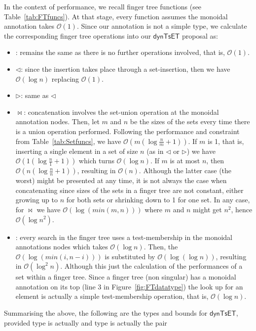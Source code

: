 \documentclass{elsarticle}
\newcommand{\code}[1]{\haskell{#1}}
\newcommand{\MATHSF}[1]{\ensuremath{\mathsf{#1}}\xspace}
\newcommand{\dyntset}{\MATHSF{dynTsET}}
\renewcommand{\O}{\ensuremath{\mathcal{O}}}
\begin{document}
In the context of performance, we recall finger tree functions (see Table~\ref{tab:FTfuncs}). At that stage, every function assumes the monoidal annotation takes $\O(1)$. Since our annotation is not a simple type, we calculate the corresponding finger tree operations into our \dyntset proposal as:
\begin{itemize}
\item \code{viewl}: remains the same as there is no further operations involved, that is, $\O(1)$.
\item $\lhd$: since the insertion takes place through a set-insertion, then we have $\O(\log n)$ replacing $\O(1)$.
\item $\rhd$: same as $\lhd$
\item $\bowtie$: concatenation involves the set-union operation at the monoidal annotation nodes. Then, let $m$ and $n$ be the sizes of the sets every time there is a union operation performed. Following the performance and constraint from Table~\ref{tab:Setfuncs}, we have $\O(m(\log\frac{n}{m} +1))$. If $m$ is 1, that is, inserting a single element in a set of size $n$ (as in $\lhd$ or $\rhd$) we have $\O(1(\log\frac{n}{1} +1))$ which turns $\O(\log n)$. If $m$ is at most $n$, then $\O(n(\log\frac{n}{n} +1))$, resulting in $\O(n)$. Although the latter case (the worst) might be presented at any time, it is not always the case when concatenating since sizes of the sets in a finger tree are not constant, either growing up to $n$ for both sets or shrinking down to 1 for one set. In any case, for $\bowtie$ we have $\O(\log(min(m,n)))$ where $m$ and $n$ might get $n^2$, hence $\O(\log n^2)$.
\item \code{search}: every search in the finger tree uses a test-membership in the monoidal annotations nodes which takes $\O(\log n)$. Then, the $\O(\log(min(i,n-i)))$ is substituted by $\O(\log (\log n))$, resulting in $\O(\log^2 n)$. Although this just the calculation of the performances of a set within a finger tree. Since a finger tree (non singular) has a monoidal annotation on its top (line 3 in Figure~\ref{fig:FTdatatype}) the look up for an element is actually a simple test-membership operation, that is, $\O(\log n)$. 
\end{itemize}

Summarising the above, the following are the types and bounds for \dyntset, provided type \code{v} is actually \code{Set b} and type \code{b} is actually the pair \code{(a,a)}
\end{document}
